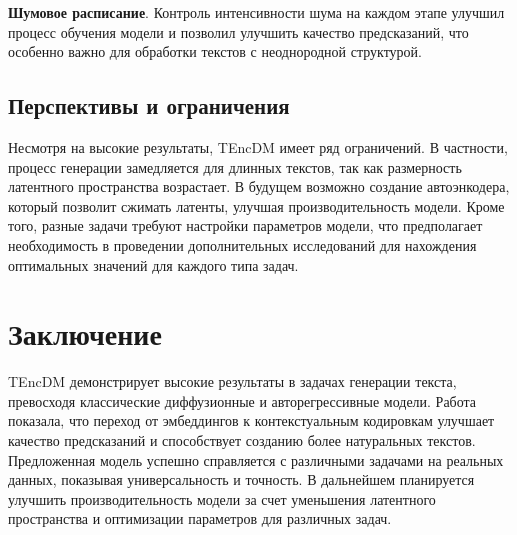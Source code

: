 \documentclass[a4paper, 12pt]{article}
\begin{document}
\textbf{Шумовое расписание}. Контроль интенсивности шума на каждом этапе улучшил процесс обучения модели и позволил улучшить качество предсказаний, что особенно важно для обработки текстов с неоднородной структурой.

\subsection{Перспективы и ограничения}
Несмотря на высокие результаты, TEncDM имеет ряд ограничений. В частности, процесс генерации замедляется для длинных текстов, так как размерность латентного пространства возрастает. В будущем возможно создание автоэнкодера, который позволит сжимать латенты, улучшая производительность модели. Кроме того, разные задачи требуют настройки параметров модели, что предполагает необходимость в проведении дополнительных исследований для нахождения оптимальных значений для каждого типа задач.

\section{Заключение}
TEncDM демонстрирует высокие результаты в задачах генерации текста, превосходя классические диффузионные и авторегрессивные модели. Работа показала, что переход от эмбеддингов к контекстуальным кодировкам улучшает качество предсказаний и способствует созданию более натуральных текстов. Предложенная модель успешно справляется с различными задачами на реальных данных, показывая универсальность и точность. В дальнейшем планируется улучшить производительность модели за счет уменьшения латентного пространства и оптимизации параметров для различных задач.



\end{document}
